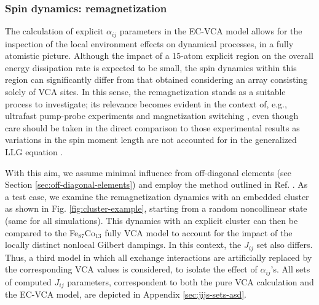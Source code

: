 \subsubsection{Spin dynamics: remagnetization}
\label{sec:explicit-asd}

The calculation of explicit $\alpha_{ij}$ parameters in the EC-VCA model allows for the inspection of the local environment effects on dynamical processes, in a fully atomistic picture. %
Although the impact of a 15-atom explicit region on the overall energy dissipation rate is expected to be small, the spin dynamics within this region can significantly differ from that obtained considering an array consisting solely of VCA sites. In this sense, the remagnetization stands as a suitable process to investigate; its relevance becomes evident in the context of, e.g., ultrafast pump-probe experiments and magnetization switching \cite{Radu2011,PhysRevLett.121.077204,Pankratova2024}, even though care should be taken in the direct comparison to those experimental results as variations in the spin moment length are not accounted for in the generalized LLG equation \cite{PhysRevB.109.094417,PhysRevMaterials.2.013801,PhysRevB.108.014433,PhysRevB.73.184427}.

With this aim, we assume minimal influence from off-diagonal elements (see Section \ref{sec:off-diagonal-elements}) and employ the method outlined in Ref. \cite{PhysRevB.108.014433}. As a test case, we examine the remagnetization dynamics with an embedded cluster as shown in Fig. \ref{fig:cluster-example}, starting from a random noncollinear state (same for all simulations). This dynamics with an explicit cluster can then be compared to the Fe$_{87}$Co$_{13}$ fully VCA model to account for the impact of the locally distinct nonlocal Gilbert dampings. In this context, the $J_{ij}$ set also differs. Thus, a third model in which all exchange interactions are artificially replaced by the corresponding VCA values is considered, to isolate the effect of $\alpha_{ij}$'s. All sets of computed $J_{ij}$ parameters, correspondent to both the pure VCA calculation and the EC-VCA model, are depicted in Appendix \ref{sec:jijs-sets-asd}.

